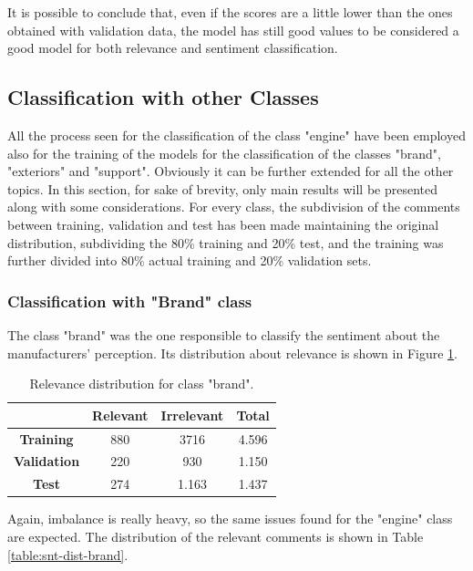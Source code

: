 It is possible to conclude that, even if the scores are a little lower than the ones obtained with validation data, the model has still good values to be considered a good model for both relevance and sentiment classification.


\subsection{Classification with other Classes}

All the process seen for the classification of the class "engine" have been employed also for the training of the models for the classification of the classes "brand", "exteriors" and "support". Obviously it can be further extended for all the other topics. In this section, for sake of brevity, only main results will be presented along with some considerations. For every class, the subdivision of the comments between training, validation and test has been made maintaining the original distribution, subdividing the 80\% training and 20\% test, and the training was further divided into 80\% actual training and 20\% validation sets.

\subsubsection{Classification with "Brand" class}

The class "brand" was the one responsible to classify the sentiment about the manufacturers' perception. Its distribution about relevance is shown in Figure \ref{table:rel-dist-brand}.

\begin{table}[H]
	\centering
	\begin{tabular}{ | c  c  c | c | } 
		\hline
		& \textbf{Relevant} & \textbf{Irrelevant} & \textbf{Total} \\
		\hline
		\textbf{Training} & 880 & 3716 & 4.596 \\ 
		\hline
		\textbf{Validation} & 220 & 930 & 1.150 \\ 
		\hline
		\textbf{Test} & 274 & 1.163 & 1.437 \\
		\hline
	\end{tabular}
	\caption{Relevance distribution for class "brand".}
	\label{table:rel-dist-brand}
\end{table}

Again, imbalance is really heavy, so the same issues found for the "engine" class are expected. The distribution of the relevant comments is shown in Table \ref{table:snt-dist-brand}.

